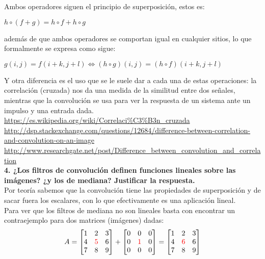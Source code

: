 \documentclass[10pt,a4paper]{article}
\begin{document}
Ambos operadores siguen el principio de superposición, estos es:

\begin{center}
$h \circ (f+g) = h \circ f + h \circ g$
\end{center}

además de que ambos operadores se comportan igual en cualquier sitios, lo que formalmente se expresa como sigue:

\begin{center}
$g(i,j) = f(i+k, j+l) \Leftrightarrow (h \circ g)(i,j) = (h \circ f)(i+k,j+l)$
\end{center}

Y otra diferencia es el uso que se le suele dar a cada una de estas operaciones: la correlación (cruzada) nos da una medida de la similitud entre dos señales, mientras que la convolución se usa para ver la respuesta de un sistema ante un impulso y una entrada dada.\\

\url{https://es.wikipedia.org/wiki/Correlaci%C3%B3n_cruzada}\\

\url{http://dsp.stackexchange.com/questions/12684/difference-between-correlation-and-convolution-on-an-image}\\

\url{http://www.researchgate.net/post/Difference_between_convolution_and_correlation}\\

\textbf{4. ¿Los filtros de convolución definen funciones lineales sobre las imágenes? ¿y los de mediana? Justificar la respuesta.}\\

Por teoría sabemos que la convolución tiene las propiedades de superposición y de sacar fuera los escalares, con lo que efectivamente es una aplicación lineal.\\

Para ver que los filtros de mediana no son lineales basta con encontrar un contraejemplo para dos matrices (imágenes) dadas:\\

\[
A =
\begin{bmatrix}
    1 & 2 & 3 \\
    4 & \textcolor{red}{5} & 6 \\
    7 & 8 & 9
\end{bmatrix}
+
\begin{bmatrix}
    0 & 0 & 0 \\
    0 & \textcolor{red}{1} & 0 \\
    0 & 0 & 0 
\end{bmatrix}
=
\begin{bmatrix}
    1 & 2 & 3 \\
    4 & \textcolor{red}{6} & 6 \\
    7 & 8 & 9
\end{bmatrix}
\]
\end{document}
